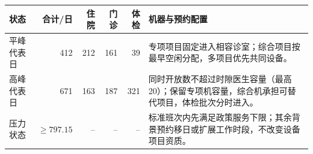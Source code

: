 \begin{tabularx}{\textwidth}{lrrrrX}
\toprule
状态 & 合计/日 & 住院 & 门诊 & 体检 & 机器与预约配置 \\
\midrule
平峰代表日 & 412 & 212 & 161 & 39 & 专项项目固定进入相容诊室；综合项目按最早空闲分配，多项目优先共同设备。 \\
高峰代表日 & 671 & 163 & 187 & 321 & 同时开放数不超过时隙医生容量（最高20）；保留专项机容量，综合机承担可替代项目，体检批次分时进入。 \\
压力状态 & $\ge 797.15$ & -- & -- & -- & 标准班次内先满足政策服务下限；其余背景预约移日或扩展工作时段，不改变设备项目资质。 \\
\bottomrule
\end{tabularx}
